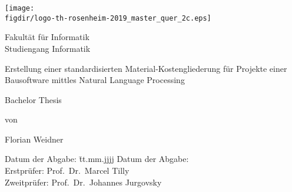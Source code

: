 \begin{titlepage}

\sffamily

\raggedleft

\vspace*{-2cm}

\texttt{[image: \\figdir/logo-th-rosenheim-2019\_master\_quer\_2c.eps]}

\vfill

\centering
\LARGE
Fakultät für Informatik  \vspace{0.5cm}\\
\Large
Studiengang Informatik

\vspace{2cm}

\LARGE

Erstellung einer standardisierten Material-Kostengliederung für Projekte einer Bausoftware mittles Natural Language Processing

\vspace{2cm}

\Large
Bachelor Thesis

\vspace{1.5cm}


\Large
von

\vspace{0.5cm}


\LARGE
Florian Weidner \vspace{1cm}

\vspace{1cm}

\flushleft
 \Large
\vspace*{\fill}

\begin{tabbing}
Datum der Abgabe: \= tt.mm.jjjj \kill
Datum der Abgabe: \>  \\
Erstprüfer: \> Prof.\ Dr.\  Marcel Tilly \\
Zweitprüfer: \> Prof.\ Dr.\ Johannes Jurgovsky
\end{tabbing}

\end{titlepage}

\cleardoubleemptypage

